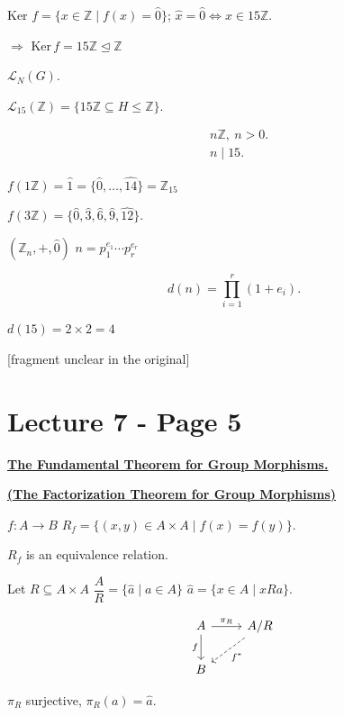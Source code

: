 \bigskip
\noindent Ker $f = \{x\in\mathbb{Z} \mid f(x)=\hat 0\}$; \quad $\hat x=\hat 0 \Leftrightarrow x\in 15\mathbb{Z}$.

\noindent $\Rightarrow$ Ker$\,f = 15\mathbb{Z} \trianglelefteq \mathbb{Z}$

\bigskip
\noindent $\mathcal{L}_N(G)$.

\noindent $\mathcal{L}_{15}(\mathbb{Z}) = \{15\mathbb{Z}\subseteq H\leq \mathbb{Z}\}$.

\[
\begin{aligned}
&n\mathbb{Z}, \ n>0.\\
&n\mid 15.
\end{aligned}
\]

\bigskip
\noindent $f(1\mathbb{Z}) = \hat 1 = \{\hat 0,\ldots,\hat{14}\} = \mathbb{Z}_{15}$

\noindent $f(3\mathbb{Z}) = \{\hat 0,\hat 3,\hat 6,\hat 9,\hat{12}\}$.

\bigskip
\noindent $(\mathbb{Z}_n,+,\hat 0)$ \quad $n=p_1^{e_1}\cdots p_r^{e_r}$

\[
d(n) = \prod_{i=1}^{r}(1+e_i).
\]

\noindent $d(15) = 2\times 2 = 4$

\noindent \footnotesize [fragment unclear in the original]\normalsize



\section*{Lecture 7 - Page 5}

\noindent\underline{\textbf{The Fundamental Theorem for Group Morphisms.}}

\noindent\underline{\textbf{(The Factorization Theorem for Group Morphisms)}}

\bigskip
\noindent $f:A\to B$ \qquad $R_f = \{(x,y)\in A\times A \mid f(x)=f(y)\}$.

\noindent $R_f$ is an equivalence relation.

\bigskip
\noindent Let $R\subseteq A\times A$ \qquad $\dfrac{A}{R} = \{\hat a \mid a\in A\}$ \qquad $\hat a = \{x\in A \mid xRa\}$.

\[
\begin{tikzcd}
A \arrow[r,"\pi_R"] \arrow[d,"f"'] & A/R \arrow[dl, dashed,"f^*"] \\
B &
\end{tikzcd}
\]

\noindent $\pi_R$ surjective, \quad $\pi_R(a) = \hat a$.

